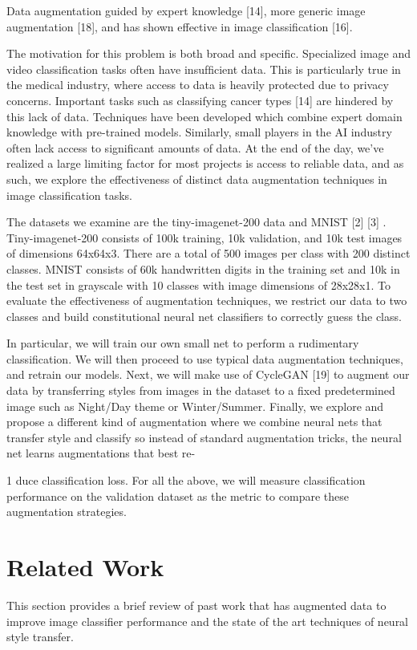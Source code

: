 \documentclass[a4paper,11pt]{article}
\begin{document}
Data augmentation guided by expert knowledge [14], more generic image augmentation [18], and has shown effective in image classiﬁcation [16].

The motivation for this problem is both broad and speciﬁc. Specialized image and video classiﬁcation tasks often have insufﬁcient data. This is particularly true in the medical industry, where access to data is heavily protected due to privacy concerns. Important tasks such as classifying cancer types [14] are hindered by this lack of data. Techniques have been developed which combine expert domain knowledge with pre-trained models. Similarly, small players in the AI industry often lack access to signiﬁcant amounts of data. At the end of the day, we’ve realized a large limiting factor for most projects is access to reliable data, and as such, we explore the effectiveness of distinct data augmentation techniques in image classiﬁcation tasks.

The datasets we examine are the tiny-imagenet-200 data and MNIST [2] [3] . Tiny-imagenet-200 consists of 100k training, 10k validation, and 10k test images of dimensions 64x64x3. There are a total of 500 images per class with 200 distinct classes. MNIST consists of 60k handwritten digits in the training set and 10k in the test set in grayscale with 10 classes with image dimensions of 28x28x1. To evaluate the effectiveness of augmentation techniques, we restrict our data to two classes and build constitutional neural net classiﬁers to correctly guess the class.

In particular, we will train our own small net to perform a rudimentary classiﬁcation. We will then proceed to use typical data augmentation techniques, and retrain our models. Next, we will make use of CycleGAN [19] to augment our data by transferring styles from images in the dataset to a ﬁxed predetermined image such as Night/Day theme or Winter/Summer. Finally, we explore and propose a different kind of augmentation where we combine neural nets that transfer style and classify so instead of standard augmentation tricks, the neural net learns augmentations that best re-

1 duce classiﬁcation loss. For all the above, we will measure classiﬁcation performance on the validation dataset as the metric to compare these augmentation strategies.

\section{Related Work}
This section provides a brief review of past work that has augmented data to improve image classiﬁer performance and the state of the art techniques of neural style transfer.
\end{document}
